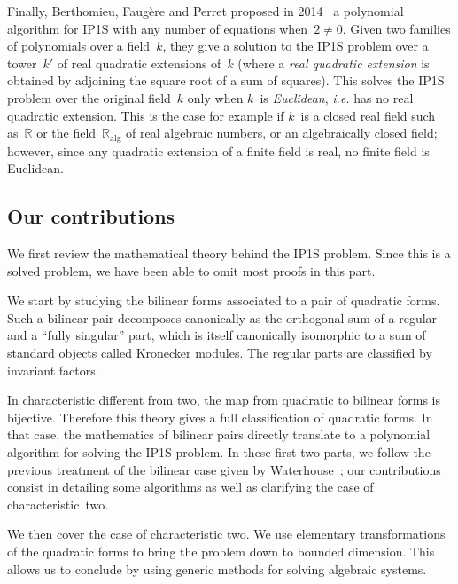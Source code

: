 \documentclass{lms}
\begin{document}
Finally, Berthomieu, Faugère and Perret
proposed in 2014~\cite{DBLP:journals/corr/BerthomieuFP13}
a polynomial algorithm for IP1S with any number of equations when~$2 ≠ 0$.
Given two families of polynomials over a field~$k$,
they give a solution to the IP1S problem
over a tower~$k'$ of real quadratic extensions of~$k$
(where a \emph{real quadratic extension} is obtained by
adjoining the square root of a sum of squares).
This solves the IP1S problem over the original field~$k$ only when
$k$~is \emph{Euclidean}, \emph{i.e.} has no real quadratic extension.
This is the case for example if $k$~is a closed real field such as~$ℝ$
or the field~$ℝ_{\mathrm{alg}}$ of real algebraic numbers,
or an algebraically closed field;
however, since any quadratic extension of a finite field is real,
no finite field is Euclidean.


\subsection*{Our contributions}

We first review the mathematical theory behind the IP1S problem.
Since this is a solved problem, we have been able to omit most proofs in
this part.

We start by studying the bilinear forms associated to
a pair of quadratic forms.
Such a bilinear pair decomposes canonically as the orthogonal sum of
a regular and a ``fully singular'' part,
which is itself canonically isomorphic to a sum of standard objects
called Kronecker modules.
The regular parts are classified by invariant factors.

In characteristic different from two,
the map from quadratic to bilinear forms is bijective.
Therefore this theory gives a full classification of quadratic forms.
In that case, the mathematics of bilinear pairs
directly translate to a polynomial algorithm for solving the IP1S problem.
In these first two parts, we follow the previous treatment of
the bilinear case given by Waterhouse~\cite{inventiones1976waterhouse};
our contributions consist in detailing some algorithms
as well as clarifying the case of characteristic~two.

We then cover the case of characteristic two.
We use elementary transformations of the quadratic forms
to bring the problem down to bounded dimension.
This allows us to conclude by using generic methods
for solving algebraic systems.
\end{document}
